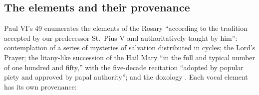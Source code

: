 \subsection{The elements and their provenance}

Paul VI's  49 enumerates the elements of the
Rosary ``according to the tradition accepted by our predecessor St.~Pius
V and authoritatively taught by him'': contemplation of a series of
mysteries of salvation distributed in cycles; the Lord's Prayer; the
litany-like succession of the Hail Mary ``in the full and typical number
of one hundred and fifty,'' with the five-decade recitation ``adopted by
popular piety and approved by papal authority''; and the doxology
. Each vocal element has its own provenance:

